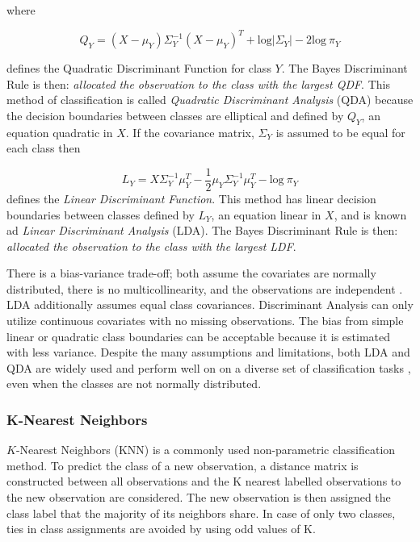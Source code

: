 \documentclass[12pt,]{article}
\begin{document}
where

\[
Q_Y = (X - \mu_Y) \Sigma^{-1}_Y (X - \mu_Y)^T + \text{log} \vert \Sigma_Y \vert - 2\text{log} ~\pi_Y   \tag{5}
\]

defines the Quadratic Discriminant Function for class \(Y\). The Bayes
Discriminant Rule is then: \emph{allocated the observation to the class
with the largest QDF}. This method of classification is called
\emph{Quadratic Discriminant Analysis} (QDA) because the decision
boundaries between classes are elliptical and defined by \(Q_Y\), an
equation quadratic in \(X\). If the covariance matrix, \(\Sigma_Y\) is
assumed to be equal for each class then

\[
L_Y = X \Sigma^{-1}_Y \mu_Y^T -\frac{1}{2}\mu_Y \Sigma^{-1}_Y \mu_Y^T  - \text{log} ~\pi_Y     \tag{6}
\] defines the \emph{Linear Discriminant Function}. This method has
linear decision boundaries between classes defined by \(L_Y\), an
equation linear in \(X\), and is known ad \emph{Linear Discriminant
Analysis} (LDA). The Bayes Discriminant Rule is then: \emph{allocated
the observation to the class with the largest LDF}.

There is a bias-variance trade-off; both assume the covariates are
normally distributed, there is no multicollinearity, and the
observations are independent \citep{cover_geometrical_1965}. LDA
additionally assumes equal class covariances. Discriminant Analysis can
only utilize continuous covariates with no missing observations. The
bias from simple linear or quadratic class boundaries can be acceptable
because it is estimated with less variance. Despite the many assumptions
and limitations, both LDA and QDA are widely used and perform well on on
a diverse set of classification tasks \citep{hastie_elements_2009}, even
when the classes are not normally distributed.

\subsubsection{K-Nearest Neighbors}\label{k-nearest-neighbors}

\(K\)-Nearest Neighbors (KNN) is a commonly used non-parametric
classification method. To predict the class of a new observation, a
distance matrix is constructed between all observations and the K
nearest labelled observations to the new observation are considered. The
new observation is then assigned the class label that the majority of
its neighbors share. In case of only two classes, ties in class
assignments are avoided by using odd values of K.
\end{document}
